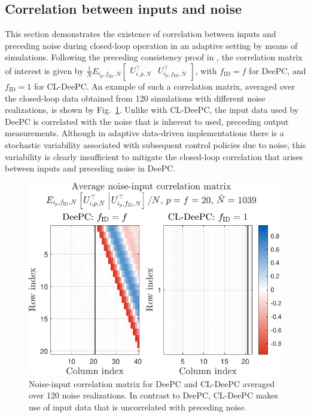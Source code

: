 \subsection{Correlation between inputs and noise}
This section demonstrates the existence of correlation between inputs and preceding noise during closed-loop operation in an adaptive setting by means of simulations. Following the preceding consistency proof in , the correlation matrix of interest is given by $\frac{1}{N}E_{i_p,f_\mathrm{ID},N}\begin{bmatrix}U_{i,p,N}^\top & U_{i_p,f_\mathrm{ID},N}^\top\end{bmatrix}$, with $f_\mathrm{ID}=f$ for \ac{DeePC}, and $f_\mathrm{ID}=1$ for \ac{CL-DeePC}. An example of such a correlation matrix, averaged over the closed-loop data obtained from 120 simulations with different noise realizations, is shown by Fig.~\ref{fig:EfUpf_correlation}. Unlike with \ac{CL-DeePC}, the input data used by \ac{DeePC} is correlated with the noise that is inherent to used, preceding output measurements. Although in adaptive data-driven implementations there is a stochastic variability associated with subsequent control policies due to noise, this variability is clearly insufficient to mitigate the closed-loop correlation that arises between inputs and preceding noise in \ac{DeePC}.
\begin{figure}[b!]
\begin{center}
\includegraphics[width=\columnwidth]{results/figures/Correlation_Nbar_1039_p_20_f_20_Re_1_Ru_1_Rdu_0_Q_100_R_0_dR_10.pdf}    %
\caption{Noise-input correlation matrix for \ac{DeePC} and \ac{CL-DeePC} averaged over 120 noise realizations. In contrast to \ac{DeePC}, \ac{CL-DeePC} makes use of input data that is uncorrelated with preceding noise.}  %
\label{fig:EfUpf_correlation}                                 %
\end{center}                                 %
\end{figure}

